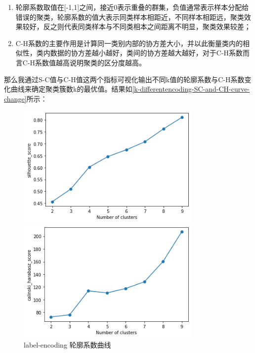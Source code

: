 \begin{enumerate}
    \item 轮廓系数取值在[-1,1]之间，接近0表示重叠的群集，负值通常表示样本分配给错误的聚类，轮廓系数的值大表示同类样本相距近，不同样本相距远，聚类效果较好，反之则代表同类样本与不同类相本之间距离不明显，聚类效果较差；
    \item C-H系数的主要作用是计算同一类别内部的协方差大小，并以此衡量类内的相似性，类内数据的协方差越小越好，类间的协方差越大越好，对于C-H系数而言C-H系数值越高说明聚类的区分度越高。
\end{enumerate}
那么我通过S-C值与C-H值这两个指标可视化输出不同k值的轮廓系数与C-H系数变化曲线来确定聚类簇数k的最优值。结果如\ref{k-differentencoding-SC-and-CH-curve-change}所示：
\begin{figure}[htb]
    \vspace{13pt} %
    \begin{minipage}[htb]{0.5\linewidth}
        \centering
        \includegraphics[width=0.8\textwidth]{images/Kmeans-auto-sc-label-encoding.png}
        \caption{label-encoding 轮廓系数曲线}
    \end{minipage}
    \begin{minipage}[htb]{0.5\linewidth}
        \centering
        \includegraphics[width=0.8\textwidth]{images/Kmeans-auto-c-h-label-encoding.png}

\end{minipage}
\end{figure}
